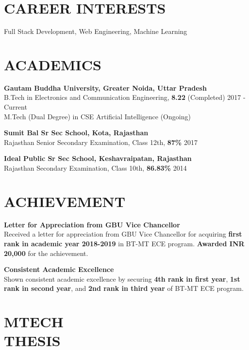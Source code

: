 \documentclass[resmargin]{res}
\begin{document}
\begin{resume}
\section{CAREER INTERESTS}
{Full Stack Development, Web Engineering, Machine Learning}

\section{ACADEMICS}
    \textbf{Gautam Buddha University, Greater Noida, Uttar Pradesh } \\
   B.Tech in Electronics and Communication Engineering, \textbf{8.22} (Completed) \hfill 2017 - Current \\
   M.Tech (Dual Degree) in CSE Artificial Intelligence (Ongoing)
   
   \textbf{Sumit Bal Sr Sec School, Kota, Rajasthan}\\
   Rajasthan Senior Secondary Examination, Class 12th, \textbf{87\%} \hfill 2017
   
   \textbf{Ideal Public Sr Sec School, Keshavraipatan, Rajasthan}\\
   Rajasthan Secondary Examination, Class 10th, \textbf{86.83\%} \hfill 2014
 
  
 

\section{ACHIEVEMENT}
 \textbf{Letter for Appreciation from GBU Vice Chancellor}
 \\ Received a letter for appreciation from GBU Vice Chancellor for acquiring \textbf{first rank in academic year 2018-2019} in BT-MT ECE program. \textbf{Awarded INR 20,000} for the achievement.

 \textbf{Consistent Academic Excellence}
 \\ Shown consistent academic excellence by securing \textbf{4th rank in first year}, \textbf{1st rank in second year}, and \textbf{2nd rank in third year} of BT-MT ECE program.

\section{MTECH\\ THESIS}


\end{resume}
\end{document}

